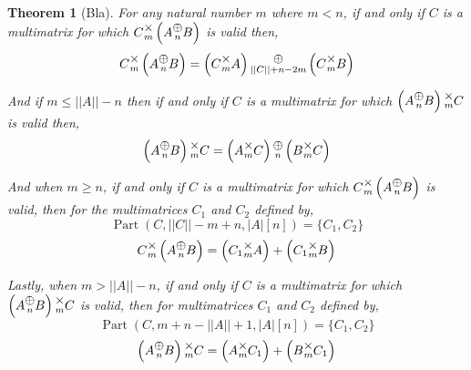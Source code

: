\documentclass[12pt]{book}
\theoremstyle{plain}
\newtheorem{theorem}{Theorem}[chapter]
\theoremstyle{definition}
\theoremstyle{ppart}
\theoremstyle{case}
\theoremstyle{solution}
\DeclareMathOperator{\Part}{Part}
\newcommand{\mmult}[1]{\text{\raisebox{1ex}{$\underset{#1}{\times}$}}}
\newcommand{\mconcat}[1]{\text{\raisebox{1ex}{$\underset{#1}{\oplus}$}}}
\newcommand{\shape}[1]{\left|#1\right|}
\begin{document}
\begin{theorem}[Bla]
For any natural number $m$ where $m < n$,
if and only if $C$ is a multimatrix for which $C \mmult{m} \left(A \mconcat{n} B\right)$ is valid then,
\[ C \mmult{m} \left(A \mconcat{n} B\right) = \left(C \mmult{m} A\right) \mconcat{\shape{\shape{C}}+n-2m} \left(C \mmult{m} B\right) \]

And if $m \le \shape{\shape{A}}-n$
then if and only if  $C$ is a multimatrix for which $\left(A \mconcat{n} B\right) \mmult{m} C$ is valid then,
\[ \left(A \mconcat{n} B\right) \mmult{m} C = \left(A \mmult{m} C\right) \mconcat{n} \left(B \mmult{m} C\right) \]

And when $m \ge n$, if and only if $C$ is a multimatrix for which $C \mmult{m} \left(A \mconcat{n} B\right)$ is valid,
then for the multimatrices $C_1$ and $C_2$ defined by,
\[ \Part(C, \shape{\shape{C}}-m+n, \shape{A}[n]) = \{C_1, C_2\} \]
\[
  C \mmult{m} \left(A \mconcat{n} B\right)
  =
  \left( C_1 \mmult{m} A \right) + 
  \left( C_1 \mmult{m} B \right)
\]

Lastly, when $m > \shape{\shape{A}}-n$, if and only if $C$ is a multimatrix for which $\left(A \mconcat{n} B\right) \mmult{m} C$ is valid,
then for multimatrices $C_1$ and $C_2$ defined by,
\[ \Part(C, m+n-\shape{\shape{A}}+1, \shape{A}[n]) = \{C_1, C_2\} \]
\[
  \left(A \mconcat{n} B\right) \mmult{m} C
  =
  \left( A \mmult{m} C_1 \right) + 
  \left( B \mmult{m} C_1 \right)
\]
\end{theorem}
\end{document}

